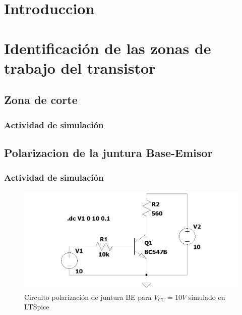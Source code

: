 \documentclass[chaptersright]{informeutn}
\begin{document}
\maketitle
\tableofcontents

\chapter{Introduccion}

\chapter{Identificación de las zonas de trabajo del transistor}

\section{Zona de corte}
  \subsection{Actividad de simulación}

  \section{Polarizacion de la juntura Base-Emisor}
    \subsection{Actividad de simulación}

    \begin{figure}[H]
        \centering
        \includegraphics[width=1\textwidth, keepaspectratio]{pictures/circuito-simulacion-pol-junt-BE.png}
        \caption{Circuito polarización de juntura BE para $V_{CC} = 10V$ simulado en LTSpice}
        \label{fig:circuito-simulacion-pol-junt-BE}
    \end{figure}
\end{document}
